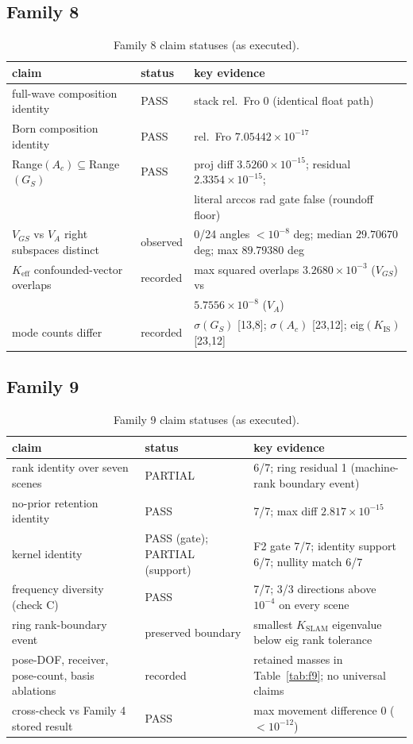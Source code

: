 \documentclass[12pt]{article}
\begin{document}
\subsection{Family 8}
\begin{table}[ht]
\centering
\small
\caption{Family 8 claim statuses (as executed).}
\label{app:tab:f8}
\begin{tabular}{p{} p{} p{}}
\toprule
claim & status & key evidence \\
\midrule
full-wave composition identity & PASS &
stack rel.\ Fro 0 (identical float path) \\
Born composition identity & PASS &
rel.\ Fro $7.05442\times10^{-17}$ \\
Range$(A_c)\subseteq$Range$(G_S)$ & PASS &
proj diff $3.5260\times10^{-15}$; residual $2.3354\times10^{-15}$; \\
 & & literal arccos rad gate false (roundoff floor) \\
$V_{GS}$ vs $V_A$ right subspaces distinct & observed &
0/24 angles $<10^{-8}$ deg; median $29.70670$ deg; max $89.79380$ deg \\
$K_{\mathrm{eff}}$ confounded-vector overlaps & recorded &
max squared overlaps $3.2680\times10^{-3}$ ($V_{GS}$) vs \\
 & & $5.7556\times10^{-8}$ ($V_A$) \\
mode counts differ & recorded &
$\sigma(G_S)$ [13,8]; $\sigma(A_c)$ [23,12];
eig$(K_{\mathrm{IS}})$ [23,12] \\
\bottomrule
\end{tabular}
\end{table}

\subsection{Family 9}
\begin{table}[ht]
\centering
\small
\caption{Family 9 claim statuses (as executed).}
\label{app:tab:f9}
\begin{tabular}{p{} p{} p{}}
\toprule
claim & status & key evidence \\
\midrule
rank identity over seven scenes & PARTIAL &
6/7; ring residual 1 (machine-rank boundary event) \\
no-prior retention identity & PASS & 7/7; max diff
$2.817\times10^{-15}$ \\
kernel identity & PASS (gate); PARTIAL (support) &
F2 gate 7/7; identity support 6/7; nullity match 6/7 \\
frequency diversity (check C) & PASS & 7/7; 3/3 directions
above $10^{-4}$ on every scene \\
ring rank-boundary event & preserved boundary &
smallest $K_{\mathrm{SLAM}}$ eigenvalue below eig rank tolerance \\
pose-DOF, receiver, pose-count, basis ablations & recorded &
retained masses in Table~\ref{tab:f9}; no universal claims \\
cross-check vs Family 4 stored result & PASS &
max movement difference 0 ($<10^{-12}$) \\
\bottomrule
\end{tabular}
\end{table}
\end{document}
